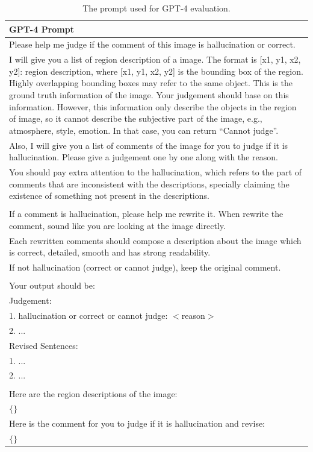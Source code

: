 \documentclass[10pt,twocolumn,letterpaper]{article}
\begin{document}
\begin{table}[t]
\footnotesize
\centering
\begin{tabular}{p{160mm}}
    \toprule
    GPT-4 Prompt
    \\
    \midrule
    Please help me judge if the comment of this image is hallucination or correct. 
    \\
    I will give you a list of region description of a image. The format is [x1, y1, x2, y2]: region description, where [x1, y1, x2, y2] is the bounding box of the region. Highly overlapping bounding boxes may refer to the same object. This is the ground truth information of the image. Your judgement should base on this information. However, this information only describe the objects in the region of image, so it cannot describe the subjective part of the image, e.g., atmosphere, style, emotion. In that case, you can return ``Cannot judge''. 
    \\
    Also, I will give you a list of comments of the image for you to judge if it is hallucination. Please give a judgement one by one along with the reason.
    \\
    You should pay extra attention to the hallucination, which refers to the part of comments that are inconsistent with the descriptions, specially claiming the existence of something not present in the descriptions.
    \\ \\
    If a comment is hallucination, please help me rewrite it. When rewrite the comment, sound like you are looking at the image directly.
    \\
    Each rewritten comments should compose a description about the image which is correct, detailed, smooth and has strong readability. 
    \\
    If not hallucination (correct or cannot judge), keep the original comment.
    \\ \\
    Your output should be:\\
    Judgement:\\
    1. hallucination or correct or cannot judge: $<$reason$>$\\
    2. ...\\
    Revised Sentences:\\
    1. ...\\
    2. ...\\ \\
    Here are the region descriptions of the image:\\
    $\{\}$
    \\
    Here is the comment for you to judge if it is hallucination and revise: \\
    $\{\}$
    \\
    \bottomrule
\end{tabular}
\caption{The prompt used for GPT-4 evaluation.}
\label{tab:gpt4_prompt}
\end{table}
\end{document}
